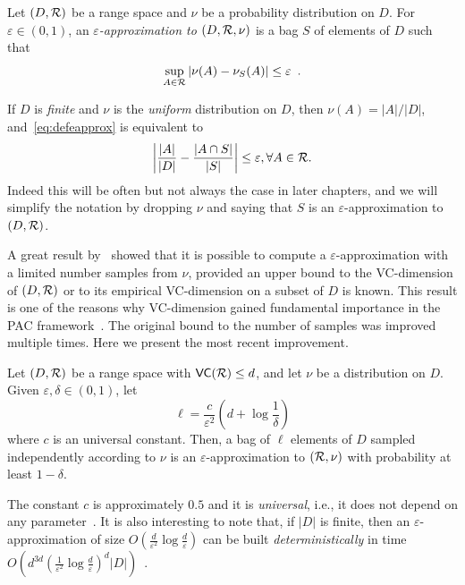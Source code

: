 \begin{definition}\label{def:eapprox}
  Let $(D,\mathcal{R})$ be a range space and $\nu$ be a probability distribution on
  $D$. For $\varepsilon\in(0,1)$, an \emph{$\varepsilon$-approximation to
  $(D,\mathcal{R},\nu)$} is a bag $S$ of elements of $D$ such that 
  \begin{equation}\label{eq:defeapprox}
  \sup_{A\in\mathcal{R}}|\nu(A)-\nu_S(A)|\le\varepsilon\enspace.
\end{equation}
\end{definition}

If $D$ is \emph{finite} and $\nu$ is the \emph{uniform} distribution on $D$, then
$\nu(A)=|A|/|D|$, and~\eqref{eq:defeapprox} is equivalent to
\[
\left|\frac{|A|}{|D|}-\frac{|A\cap S|}{|S|}\right|\le\varepsilon, \forall
A\in\mathcal{R}.
\]
Indeed this will be often but not always the case in later chapters, and we will
simplify the notation by dropping $\nu$ and saying that $S$ is an
$\varepsilon$-approximation to $(D,\mathcal{R})$.

A great result by~\citet{VapnikC71} showed that it is possible
to compute a $\varepsilon$-approximation with a limited number samples from
$\nu$, provided an upper bound to the VC-dimension of $(D,\mathcal{R})$ or to its
empirical VC-dimension on a subset of $D$ is known. This result is one of the
reasons why VC-dimension gained fundamental importance in the PAC
framework~\citep{KearnsV94}. The original bound to the number of samples was
improved multiple times. Here we present the most recent improvement.

\begin{theorem}\label{thm:eapprox}
  Let $(D,\mathcal{R})$ be a range space with $\mathsf{VC}(\mathcal{R})\le d$, and let $\nu$ be a
  distribution on $D$. Given $\varepsilon,\delta\in(0,1)$, let
  \begin{equation}\label{eq:vceapprox}
  \ell = \frac{c}{\varepsilon^2}\left(d + \log\frac{1}{\delta}\right)
  \end{equation}
  where $c$ is an universal constant. Then, a bag of $\ell$ elements of $D$
  sampled independently according to $\nu$ is an $\varepsilon$-approximation to
  $(\mathcal{R},\nu)$ with probability at least $1-\delta$.
\end{theorem}
The constant $c$ is approximately $0.5$ and it is
\emph{universal}, i.e., it does not depend on any parameter~\citep{LofflerP09}.  
It is also interesting to note that, if $|D|$ is finite, then an
$\varepsilon$-approximation of size
$O(\frac{d}{\varepsilon^2}\log{\frac{d}{\varepsilon}})$ can be built
\emph{deterministically} in time
$O(d^{3d}(\frac{1}{\varepsilon^2}\log{\frac{d}{\varepsilon}})^d|D|)$~\citep{Chazelle00}.

